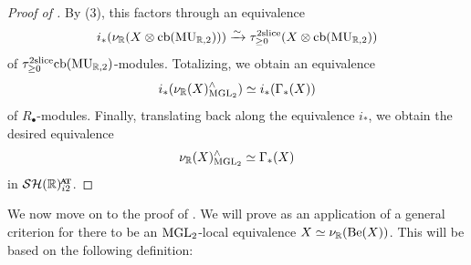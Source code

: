 \begin{proof}[Proof of ]
  By (3), this factors through an equivalence
  \[i_* (\nu_{\mathbb{R}} (X \otimes \mathrm{cb}(\operatorname{\mathrm{MU}}_{\mathbb{R}, 2}))) \xrightarrow{\sim} \tau_{\geq 0} ^{2\mathrm{slice}} (X \otimes \mathrm{cb}(\operatorname{\mathrm{MU}}_{\mathbb{R}, 2}))\]
  of $\tau_{\geq 0} ^{2\mathrm{slice}} \mathrm{cb}(\operatorname{\mathrm{MU}}_{\mathbb{R}, 2})$-modules.
  Totalizing, we obtain an equivalence
  \[i_* (\nu_{\mathbb{R}} (X)^{\wedge} _{\mathrm{MGL}_2}) \simeq i_* (\Gamma_* (X))\]
  of $R_{\bullet}$-modules.
  Finally, translating back along the equivalence $i_*$, we obtain the desired equivalence
  \[\nu_{\mathbb{R}}(X)^{\wedge} _{\mathrm{MGL}_2} \simeq \Gamma_* (X)\]
  in $\SHRat$.
%
\end{proof}

%
%
We now move on to the proof of .
We will prove  as an application of a general criterion for there to be an $\mathrm{MGL}_2$-local equivalence $X \simeq \nu_{\mathbb{R}} (\mathrm{Be}(X))$. This will be based on the following definition:

